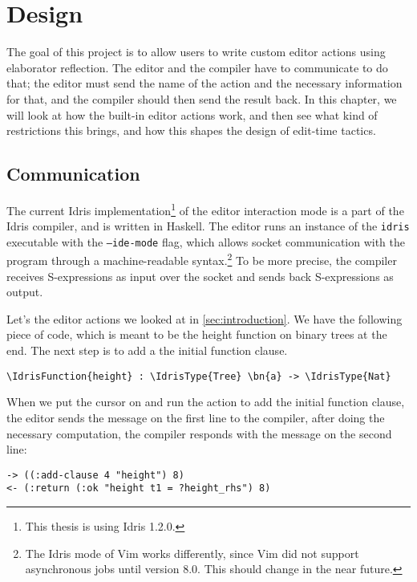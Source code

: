 \section{Design}\label{sec:design}
The goal of this project is to allow users to write custom editor actions using
elaborator reflection.
The editor and the compiler have to communicate to do that; the editor must
send the name of the action and the necessary information for that, and the
compiler should then send the result back.
In this chapter, we will look at how the built-in editor actions work, and then
see what kind of restrictions this brings, and how this shapes the design of
edit-time tactics.

\subsection{Communication}\label{ssec:communication}

The current Idris implementation\footnote{This thesis is using Idris 1.2.0.} of
the editor interaction mode is a part of the Idris compiler, and is written in
Haskell.
The editor runs an instance of the \texttt{idris} executable with the
\texttt{--ide-mode} flag, which
allows socket communication with the program through a machine-readable
syntax.\footnote{The Idris mode of Vim works differently, since Vim did not
support asynchronous jobs until version 8.0. This should change in the near future.}
To be more precise, the compiler receives S-expressions\cite{mccarthy} as input
over the socket and sends back S-expressions as output.

Let's the editor actions we looked at in \autoref{sec:introduction}.
We have the following piece of code, which is meant to be the height function
on binary trees at the end. The next step is to add a the initial function clause.

\begin{Verbatim}[framesep=2mm, label=\footnotesize{\normalfont{Idris}}, labelposition=topline]
\IdrisFunction{height} : \IdrisType{Tree} \bn{a} -> \IdrisType{Nat}
\end{Verbatim}

When we put the cursor on  and run the action to add the initial
function clause, the editor sends the message on the first line to the
compiler, after doing the necessary computation, the compiler responds with the
message on the second line:

\begin{Verbatim}[framesep=2mm, label=\footnotesize{\normalfont{S-expression}}, labelposition=topline]
-> ((:add-clause 4 "height") 8)
<- (:return (:ok "height t1 = ?height_rhs") 8)
\end{Verbatim}

